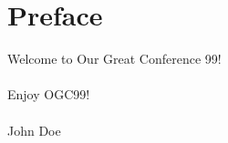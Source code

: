 \chapter*{Preface}
\thispagestyle{empty}

Welcome to Our Great Conference 99!
\\ \\
Enjoy OGC99!
\\ \\
John Doe

\newpage
